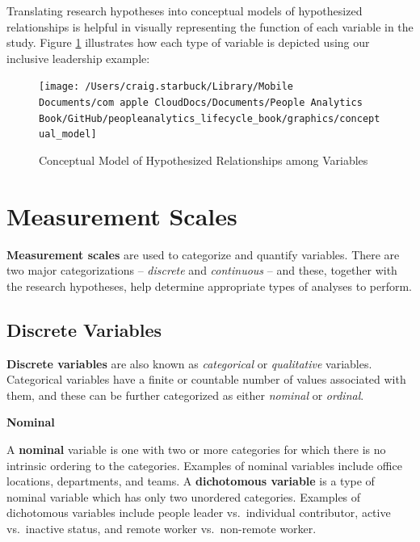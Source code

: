 \documentclass[]{book}
\begin{document}
Translating research hypotheses into conceptual models of hypothesized relationships is helpful in visually representing the function of each variable in the study. Figure \ref{fig:concept-mdl} illustrates how each type of variable is depicted using our inclusive leadership example:

\begin{figure}

{\centering \texttt{[image: /Users/craig.starbuck/Library/Mobile Documents/com~apple~CloudDocs/Documents/People Analytics Book/GitHub/peopleanalytics\_lifecycle\_book/graphics/conceptual\_model]} 

}

\caption{Conceptual Model of Hypothesized Relationships among Variables}\label{fig:concept-mdl}
\end{figure}

\hypertarget{measurement-scales}{%
\section{Measurement Scales}\label{measurement-scales}}

\textbf{Measurement scales} are used to categorize and quantify variables. There are two major categorizations -- \emph{discrete} and \emph{continuous} -- and these, together with the research hypotheses, help determine appropriate types of analyses to perform.

\hypertarget{discrete-variables}{%
\subsection{Discrete Variables}\label{discrete-variables}}

\textbf{Discrete variables} are also known as \emph{categorical} or \emph{qualitative} variables. Categorical variables have a finite or countable number of values associated with them, and these can be further categorized as either \emph{nominal} or \emph{ordinal}.

\textbf{Nominal}

A \textbf{nominal} variable is one with two or more categories for which there is no intrinsic ordering to the categories. Examples of nominal variables include office locations, departments, and teams. A \textbf{dichotomous variable} is a type of nominal variable which has only two unordered categories. Examples of dichotomous variables include people leader vs.~individual contributor, active vs.~inactive status, and remote worker vs.~non-remote worker.
\end{document}
